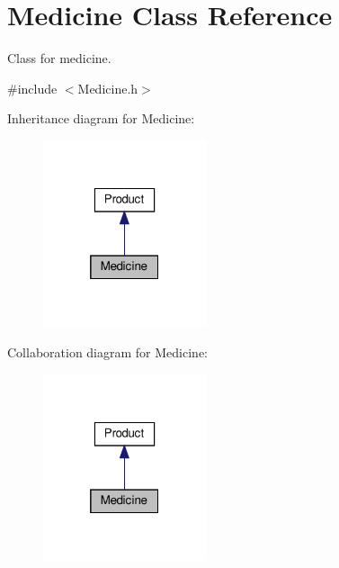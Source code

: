 \hypertarget{classMedicine}{}\section{Medicine Class Reference}
\label{classMedicine}


Class for medicine.  




{\ttfamily \#include $<$Medicine.\+h$>$}



Inheritance diagram for Medicine\+:\nopagebreak
\begin{figure}[H]
\begin{center}
\leavevmode
\includegraphics[width=136pt]{classMedicine__inherit__graph}
\end{center}
\end{figure}


Collaboration diagram for Medicine\+:\nopagebreak
\begin{figure}[H]
\begin{center}
\leavevmode
\includegraphics[width=136pt]{classMedicine__coll__graph}
\end{center}
\end{figure}
